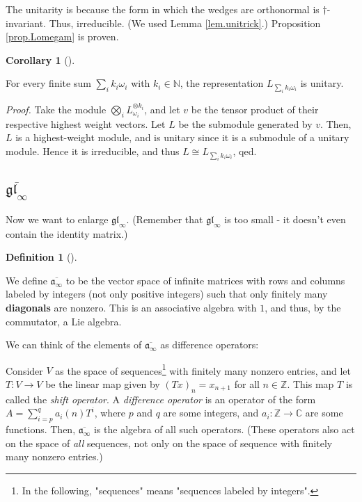 \documentclass
[numbers=enddot,12pt,final,onecolumn,german,notitlepage]{scrartcl}%
\theoremstyle{definition}
\newtheorem{defi}[theo]{Definition}
\newenvironment{definition}[1][]
{\begin{defi}[#1]\begin{leftbar}}
{\end{leftbar}\end{defi}}
\newtheorem{coro}[theo]{Corollary}
\newenvironment{corollary}[1][]
{\begin{coro}[#1]\begin{leftbar}}
{\end{leftbar}\end{coro}}
\begin{document}
The unitarity is because the form in which the wedges are orthonormal is
$\dag$-invariant. Thus, irreducible. (We used Lemma \ref{lem.unitrick}.)
Proposition \ref{prop.Lomegam} is proven.

\begin{corollary}
For every finite sum $\sum\limits_{i}k_{i}\omega_{i}$ with $k_{i}\in
\mathbb{N}$, the representation $L_{\sum\limits_{i}k_{i}\omega_{i}}$ is unitary.
\end{corollary}

\textit{Proof.} Take the module $\bigotimes\limits_{i}L_{\omega_{i}}^{\otimes
k_{i}}$, and let $v$ be the tensor product of their respective highest weight
vectors. Let $L$ be the submodule generated by $v$. Then, $L$ is a
highest-weight module, and is unitary since it is a submodule of a unitary
module. Hence it is irreducible, and thus $L\cong L_{\sum\limits_{i}%
k_{i}\omega_{i}}$, qed.

\subsection{$\overline{\mathfrak{gl}_{\infty}}$}

Now we want to enlarge $\mathfrak{gl}_{\infty}$. (Remember that $\mathfrak{gl}%
_{\infty}$ is too small - it doesn't even contain the identity matrix.)

\begin{definition}
We define $\overline{\mathfrak{a}_{\infty}}$ to be the vector space of
infinite matrices with rows and columns labeled by integers (not only positive
integers) such that only finitely many \textbf{diagonals} are nonzero. This is
an associative algebra with $1$, and thus, by the commutator, a Lie algebra.
\end{definition}

We can think of the elements of $\overline{\mathfrak{a}_{\infty}}$ as
difference operators:

Consider $V$ as the space of sequences\footnote{In the following, "sequences"
means "sequences labeled by integers".} with finitely many nonzero entries,
and let $T:V\rightarrow V$ be the linear map given by $\left(  Tx\right)
_{n}=x_{n+1}$ for all $n\in\mathbb{Z}$. This map $T$ is called the
\textit{shift operator}. A \textit{difference operator} is an operator of the
form $A=\sum\limits_{i=p}^{q}a_{i}\left(  n\right)  T^{i}$, where $p$ and $q$
are some integers, and $a_{i}:\mathbb{Z}\rightarrow\mathbb{C}$ are some
functions. Then, $\overline{\mathfrak{a}_{\infty}}$ is the algebra of all such
operators. (These operators also act on the space of \textit{all} sequences,
not only on the space of sequence with finitely many nonzero entries.)
\end{document}
